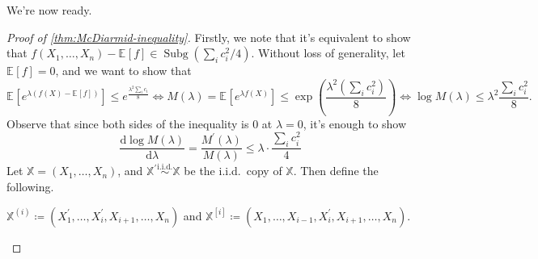 We're now ready.

\begin{proof}[Proof of \autoref{thm:McDiarmid-inequality}]
	Firstly, we note that it's equivalent to show that \(f(X_1, \dots , X_n) - \mathbb{E}_{}\left[f \right] \in \mathop{\mathrm{Subg}}(\sum_{i} c_i^2 / 4) \). Without loss of generality, let \(\mathbb{E}_{}\left[f \right] = 0\), and we want to show that
	\[
		\mathbb{E}_{}\left[e^{\lambda (f(X) - \mathbb{E}_{}\left[f \right] )} \right] \leq e^{\frac{\lambda ^2 \sum_{i} c_i}{8}}
		\iff  M(\lambda ) = \mathbb{E}_{}\left[e^{\lambda f(X)} \right] \leq \exp \left( \frac{\lambda ^2 \left( \sum_{i} c_i^2 \right) }{8} \right)
		\iff  \log M(\lambda ) \leq \lambda ^2 \frac{\sum_{i} c_i^2}{8}.
	\]
	Observe that since both sides of the inequality is \(0\) at \(\lambda = 0\), it's enough to show
	\[
		\frac{\mathrm{d}\log M(\lambda )}{\mathrm{d}\lambda } = \frac{M^{\prime} (\lambda )}{M(\lambda )} \leq \lambda \cdot \frac{\sum_{i} c_i^2}{4}
	\]
	Let \(\mathbb{X} = (X_1, \dots , X_n)\), and \(\mathbb{X}^{\prime} \overset{\text{i.i.d.} }{\sim } \mathbb{X}\) be the i.i.d.\ copy of \(\mathbb{X}\). Then define the following.

	\begin{notation}\label{not:lec5}
		\(\mathbb{X}^{(i)} \coloneqq (X_1^{\prime} , \dots , X_i^{\prime} , X_{i+1}, \dots , X_n)\) and \(\mathbb{X}^{[i]} \coloneqq (X_1, \dots , X_{i-1}, X_i^{\prime} , X_{i+1}, \dots , X_n)\).
	\end{notation}


\end{proof}
